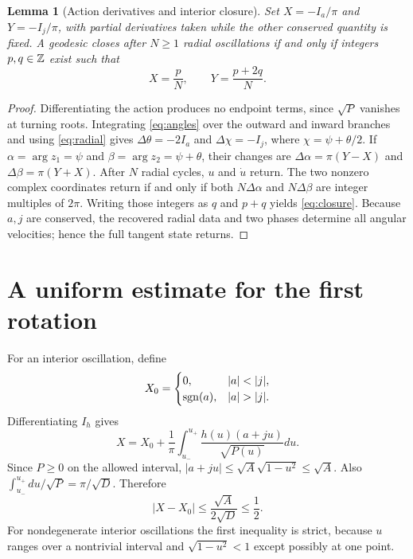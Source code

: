 \documentclass[11pt,a4paper]{article}
\newtheorem{lemma}[theorem]{Lemma}
\theoremstyle{remark}\newtheorem{remark}[theorem]{Remark}
\begin{document}
\begin{lemma}[Action derivatives and interior closure]\label{lem:closure}
Set $X=-I_a/\pi$ and $Y=-I_j/\pi$, with partial derivatives taken while the other conserved quantity is fixed. A geodesic closes after $N\ge1$ radial oscillations if and only if integers $p,q\in\mathbb Z$ exist such that
\begin{equation}\label{eq:closure}
\boxed{X=\frac pN,\qquad Y=\frac{p+2q}{N}.}
\end{equation}
\end{lemma}
\begin{proof}
Differentiating the action produces no endpoint terms, since $\sqrt P$ vanishes at turning roots. Integrating \eqref{eq:angles} over the outward and inward branches and using \eqref{eq:radial} gives $\Delta\theta=-2I_a$ and $\Delta\chi=-I_j$, where $\chi=\psi+\theta/2$. If $\alpha=\arg z_1=\psi$ and $\beta=\arg z_2=\psi+\theta$, their changes are $\Delta\alpha=\pi(Y-X)$ and $\Delta\beta=\pi(Y+X)$. After $N$ radial cycles, $u$ and $\dot u$ return. The two nonzero complex coordinates return if and only if both $N\Delta\alpha$ and $N\Delta\beta$ are integer multiples of $2\pi$. Writing those integers as $q$ and $p+q$ yields \eqref{eq:closure}. Because $a,j$ are conserved, the recovered radial data and two phases determine all angular velocities; hence the full tangent state returns.
\end{proof}

\section{A uniform estimate for the first rotation}
For an interior oscillation, define
\[
X_0=\begin{cases}0,&|a|<|j|,\\\sgn(a),&|a|>|j|.\end{cases}
\]
Differentiating $I_h$ gives
\begin{equation}\label{eq:X}
X=X_0+\frac1\pi\int_{u_-}^{u_+}\frac{h(u)(a+ju)}{\sqrt{P(u)}}du.
\end{equation}
Since $P\ge0$ on the allowed interval, $|a+ju|\le\sqrt A\sqrt{1-u^2}\le\sqrt A$. Also $\int_{u_-}^{u_+}du/\sqrt P=\pi/\sqrt D$. Therefore
\begin{equation}\label{eq:Xbound}
\boxed{|X-X_0|\le\frac{\sqrt A}{2\sqrt D}\le\frac12.}
\end{equation}
For nondegenerate interior oscillations the first inequality is strict, because $u$ ranges over a nontrivial interval and $\sqrt{1-u^2}<1$ except possibly at one point.
\end{document}
